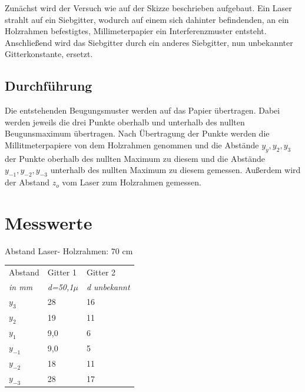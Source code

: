 \documentclass[12pt,a4paper,titlepage,headinclude,bibtotoc]{scrartcl}
\begin{document}
Zunächst wird der Versuch wie auf der Skizze beschrieben aufgebaut.
Ein Laser strahlt auf ein Siebgitter, wodurch auf einem sich dahinter befindenden, an ein Holzrahmen befestigtes, Millimeterpapier ein Interferenzmuster entsteht. Anschließend wird das Siebgitter durch ein anderes Siebgitter, nun unbekannter Gitterkonstante, ersetzt.


\subsection{Durchführung}
Die entstehenden Beugungsmuster werden auf das Papier übertragen. Dabei werden jeweils die drei Punkte  oberhalb und unterhalb des nullten Beugunsmaximum übertragen.
Nach Übertragung der Punkte werden die Millitmeterpapiere von dem Holzrahmen genommen und die Abstände $y_{y},y_{2},y_{3}$ der Punkte oberhalb des nullten Maximum zu diesem und die Abstände $y_{-1},y_{-2},y_{-3}$ unterhalb des nullten Maximum zu diesem gemessen. Außerdem wird der Abstand $z_{o}$ vom Laser zum Holzrahmen gemessen.


\section{Messwerte}


Abstand Laser- Holzrahmen: 70 cm


\begin{table} [h]
\centering
\begin{large}

\end{large}
\begin{tabular}{|p{4 cm}||p{4 cm}|p{4 cm}|}
        \hline
          Abstand  & Gitter 1  & Gitter 2 \\
          \textit{in mm} & \textit{d=50,1$\mu$} & \textit{d unbekannt}\\
         
         
         \hline 
         $y_3 $& 28 & 16 \\
         \hline
         $y_2 $& 19 & 11\\
         \hline
         $y_{1} $& 9,0 & 6 \\
         \hline
         $y_{-1}$& 9,0 & 5 \\
         \hline
         $y_{-2}$& 18 & 11 \\
         \hline             
         $y_{-3}$& 28 & 17 \\
         \hline
\end{tabular}
\end{table}
\end{document}
